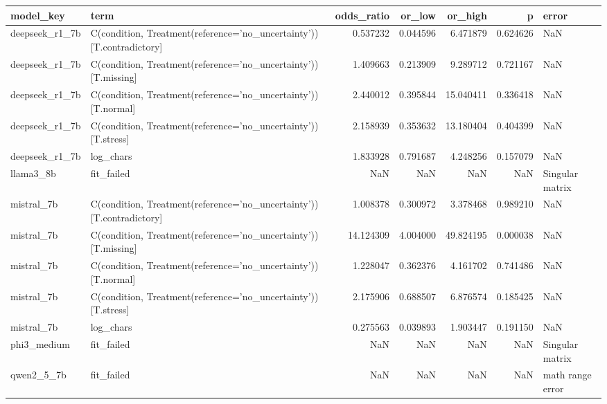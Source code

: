 \begin{tabular}{llrrrrl}
\toprule
model\_key & term & odds\_ratio & or\_low & or\_high & p & error \\
\midrule
deepseek\_r1\_7b & C(condition, Treatment(reference='no\_uncertainty'))[T.contradictory] & 0.537232 & 0.044596 & 6.471879 & 0.624626 & NaN \\
deepseek\_r1\_7b & C(condition, Treatment(reference='no\_uncertainty'))[T.missing] & 1.409663 & 0.213909 & 9.289712 & 0.721167 & NaN \\
deepseek\_r1\_7b & C(condition, Treatment(reference='no\_uncertainty'))[T.normal] & 2.440012 & 0.395844 & 15.040411 & 0.336418 & NaN \\
deepseek\_r1\_7b & C(condition, Treatment(reference='no\_uncertainty'))[T.stress] & 2.158939 & 0.353632 & 13.180404 & 0.404399 & NaN \\
deepseek\_r1\_7b & log\_chars & 1.833928 & 0.791687 & 4.248256 & 0.157079 & NaN \\
llama3\_8b & fit\_failed & NaN & NaN & NaN & NaN & Singular matrix \\
mistral\_7b & C(condition, Treatment(reference='no\_uncertainty'))[T.contradictory] & 1.008378 & 0.300972 & 3.378468 & 0.989210 & NaN \\
mistral\_7b & C(condition, Treatment(reference='no\_uncertainty'))[T.missing] & 14.124309 & 4.004000 & 49.824195 & 0.000038 & NaN \\
mistral\_7b & C(condition, Treatment(reference='no\_uncertainty'))[T.normal] & 1.228047 & 0.362376 & 4.161702 & 0.741486 & NaN \\
mistral\_7b & C(condition, Treatment(reference='no\_uncertainty'))[T.stress] & 2.175906 & 0.688507 & 6.876574 & 0.185425 & NaN \\
mistral\_7b & log\_chars & 0.275563 & 0.039893 & 1.903447 & 0.191150 & NaN \\
phi3\_medium & fit\_failed & NaN & NaN & NaN & NaN & Singular matrix \\
qwen2\_5\_7b & fit\_failed & NaN & NaN & NaN & NaN & math range error \\
\bottomrule
\end{tabular}
